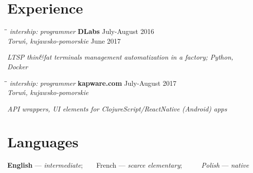 \documentclass[a4paper]{res}
\begin{document}
\begin{resume}
    \section{Experience}
    \vspace{-0.05in}
    \begin{tabbing}
        \hspace{2.3in}\= \hspace{2.6in}\= \kill
        \textit{intership:} \textsl{programmer}\>
        \textbf{DLabs} \>
        July-August 2016\\
        \> \textsl{Toruń, kujawsko-pomorskie}
        \> June 2017
    \end{tabbing}\vspace{-20pt}
    \hspace{.5in}\textsl{LTSP thin\&fat terminals management automatization in a factory; Python, Docker}
    \vspace{-0.17in}
    \begin{tabbing}
        \hspace{2.3in}\= \hspace{2.6in}\= \kill
        \textit{intership:} \textsl{programmer}\>
        \textbf{kapware.com} \>
        July-August 2017\\
        \> \textsl{Toruń, kujawsko-pomorskie}
    \end{tabbing}\vspace{-17pt}
    \hspace{.5in}\textsl{API wrappers, UI elements for ClojureScript/ReactNative (Android) apps}
    \vspace{-0.17in}
    \section{Languages}
    \vspace{0.05in}
    \textbf{English} — \textsl{intermediate}; ~ ~ 
    French — \textsl{scarce elementary}; ~ ~ ~
    \textit{Polish} — \textsl{native}

\end{resume}
\end{document}
